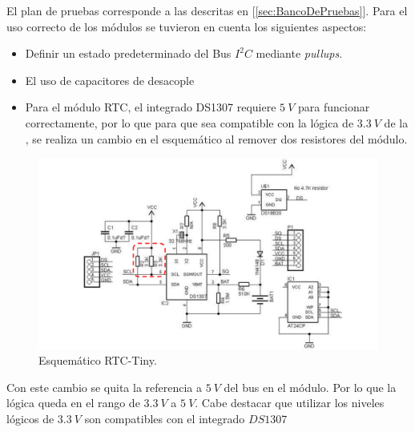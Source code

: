 El plan de pruebas corresponde a las descritas en [\ref{sec:BancoDePruebas}].
Para el uso correcto de los módulos se tuvieron en cuenta los siguientes aspectos:
\begin{itemize}
	\item Definir un estado predeterminado del Bus $I^2C$ mediante \textit{pullups}.
	\item El uso de capacitores de desacople
	\item Para el módulo RTC, el integrado DS1307 requiere $5 \ V$ para funcionar correctamente, por lo que para que sea compatible con la lógica de $3.3 \ V$ de la \rspi, se realiza un cambio en el esquemático al remover dos resistores del módulo.
\end{itemize}

\begin{figure}[H]
	\centering
	\includegraphics[width=0.9\linewidth,page=1]{ImagenesIngenieria de detalle/rtcTinySchematic}
	\caption{Esquemático RTC-Tiny.}
	\label{fig:RTCSchematic}
\end{figure}

Con este cambio se quita la referencia a $5 \ V$ del bus en el módulo. Por lo que la lógica queda en el rango de $3.3 \ V$ a $5 \ V$. Cabe destacar que utilizar los niveles lógicos de $3.3 \ V$ son compatibles con el integrado $DS1307$


